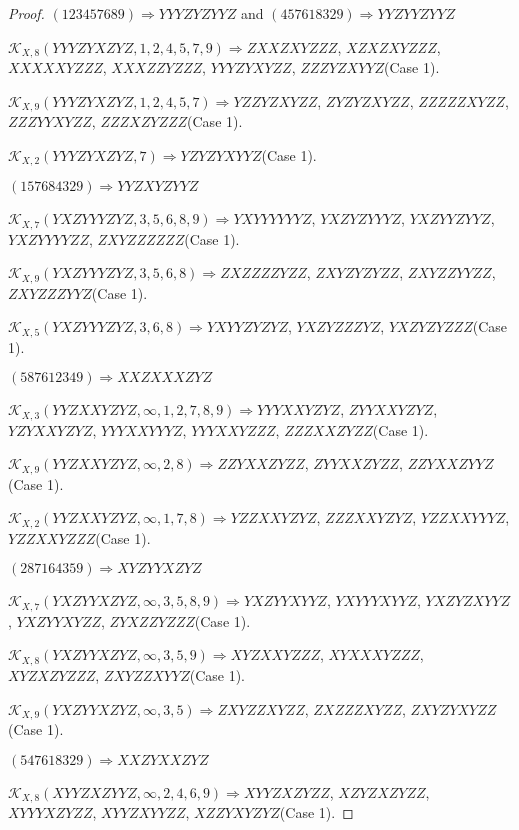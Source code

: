 \documentclass[12pt]{article}
\theoremstyle{plain}
\theoremstyle{definition}
\theoremstyle{remark}
\newcommand{\fancy}[1]{\mathcal{#1}}
\def\K{\fancy{K}}
\begin{document}
\begin{proof}
	
	
	$(1 2 3 4 5 7 6 8 9)\Rightarrow YYYZYZYYZ$ and $(4 5 7 6 1 8 3 2 9)\Rightarrow YYZYYZYYZ$
	
	
	$\K_{X,8}(YYYZYXZYZ,1, 2, 4, 5, 7, 9)\Rightarrow $$ZXXZXYZZZ$, $XZXZXYZZZ$, $XXXXXYZZZ$, $XXXZZYZZZ$, $YYYZYXYZZ$, $ZZZYZXYYZ$(Case 1).
	
	$\K_{X,9}(YYYZYXZYZ,1, 2, 4, 5, 7)\Rightarrow $$YZZYZXYZZ$, $ZYZYZXYZZ$, $ZZZZZXYZZ$, $ZZZYYXYZZ$, $ZZZXZYZZZ$(Case 1).
	
	$\K_{X,2}(YYYZYXZYZ,7)\Rightarrow $$YZYZYXYYZ$(Case 1).
	
	
	
	$(1 5 7 6 8 4 3 2 9)\Rightarrow YYZXYZYYZ$
	
	
	$\K_{X,7}(YXZYYYZYZ,3, 5, 6, 8, 9)\Rightarrow $$YXYYYYYYZ$, $YXZYZYYYZ$, $YXZYYZYYZ$, $YXZYYYYZZ$, $ZXYZZZZZZ$(Case 1).
	
	$\K_{X,9}(YXZYYYZYZ,3, 5, 6, 8)\Rightarrow $$ZXZZZZYZZ$, $ZXYZYZYZZ$, $ZXYZZYYZZ$, $ZXYZZZYYZ$(Case 1).
	
	$\K_{X,5}(YXZYYYZYZ,3, 6, 8)\Rightarrow $$YXYYZYZYZ$, $YXZYZZZYZ$, $YXZYZYZZZ$(Case 1).
	
	
	
	$(5 8 7 6 1 2 3 4 9)\Rightarrow XXZXXXZYZ$
	
	
	$\K_{X,3}(YYZXXYZYZ,\infty,1, 2, 7, 8, 9)\Rightarrow $$YYYXXYZYZ$, $ZYYXXYZYZ$, $YZYXXYZYZ$, $YYYXXYYYZ$, $YYYXXYZZZ$, $ZZZXXZYZZ$(Case 1).
	
	$\K_{X,9}(YYZXXYZYZ,\infty,2, 8)\Rightarrow $$ZZYXXZYZZ$, $ZYYXXZYZZ$, $ZZYXXZYYZ$(Case 1).
	
	$\K_{X,2}(YYZXXYZYZ,\infty,1, 7, 8)\Rightarrow $$YZZXXYZYZ$, $ZZZXXYZYZ$, $YZZXXYYYZ$, $YZZXXYZZZ$(Case 1).
	
	
	
	$(2 8 7 1 6 4 3 5 9)\Rightarrow XYZYYXZYZ$
	
	
	$\K_{X,7}(YXZYYXZYZ,\infty,3, 5, 8, 9)\Rightarrow $$YXZYYXYYZ$, $YXYYYXYYZ$, $YXZYZXYYZ$, $YXZYYXYZZ$, $ZYXZZYZZZ$(Case 1).
	
	$\K_{X,8}(YXZYYXZYZ,\infty,3, 5, 9)\Rightarrow $$XYZXXYZZZ$, $XYXXXYZZZ$, $XYZXZYZZZ$, $ZXYZZXYYZ$(Case 1).
	
	$\K_{X,9}(YXZYYXZYZ,\infty,3, 5)\Rightarrow $$ZXYZZXYZZ$, $ZXZZZXYZZ$, $ZXYZYXYZZ$(Case 1).
	
	
	
	$(5 4 7 6 1 8 3 2 9)\Rightarrow XXZYXXZYZ$
	
	
	$\K_{X,8}(XYYZXZYYZ,\infty,2, 4, 6, 9)\Rightarrow $$XYYZXZYZZ$, $XZYZXZYZZ$, $XYYYXZYZZ$, $XYYZXYYZZ$, $XZZYXYZYZ$(Case 1).
	

\end{proof}
\end{document}
